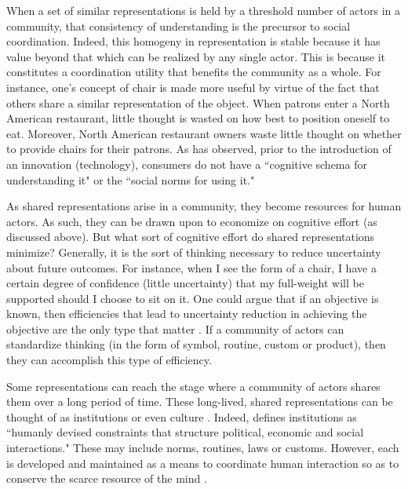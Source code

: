 When a set of similar representations is held by a threshold number of actors in a community, that consistency of understanding is the precursor to social coordination. Indeed, this homogeny in representation is stable because it has value beyond that which can be realized by any single actor. This is because it constitutes a coordination utility that benefits the community as a whole. For instance, one's concept of chair is made more useful by virtue of the fact that others share a similar representation of the object. When patrons enter a North American restaurant, little thought is wasted on how best to position oneself to eat. Moreover, North American restaurant owners waste little thought on whether to provide chairs for their patrons. As \citet{humphreys2010} has observed, prior to the introduction of an innovation (technology), consumers do not have a ``cognitive schema for understanding it" or the ``social norms for using it." 

As shared representations arise in a community, they become resources for human actors. As such, they can be drawn upon to economize on cognitive effort (as discussed above). But what sort of cognitive effort do shared representations minimize? Generally, it is the sort of thinking necessary to reduce uncertainty about future outcomes. For instance, when I see the form of a chair, I have a certain degree of confidence (little uncertainty) that my full-weight will be supported should I choose to sit on it. One could argue that if an objective is known, then efficiencies that lead to uncertainty reduction in achieving the objective are the only type that matter \citep{loasby1999}. If a community of actors can standardize thinking (in the form of symbol, routine, custom or product), then they can accomplish this type of efficiency. 

Some representations can reach the stage where a community of actors shares them over a long period of time. These long-lived, shared representations can be thought of as institutions or even culture \citep{sperber1985}. Indeed, \citet{north1990} defines institutions as ``humanly devised constraints that structure political, economic and social interactions."  These may include norms, routines, laws or customs. However, each is developed and maintained as a means to coordinate human interaction so as to conserve the scarce resource of the mind \citep{loasby1999}. 

